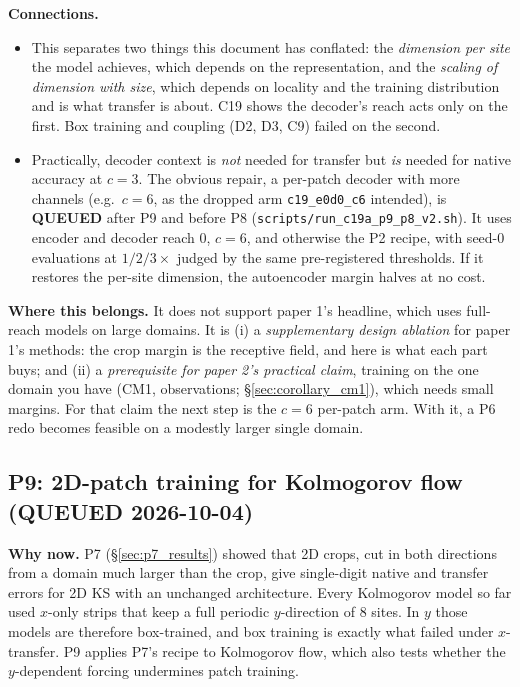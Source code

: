 \documentclass[11pt]{article}
\begin{document}
\textbf{Connections.}
\begin{itemize}[leftmargin=*]
\item This separates two things this document has conflated: the
  \emph{dimension per site} the model achieves, which depends on the
  representation, and the \emph{scaling of dimension with size}, which
  depends on locality and the training distribution and is what
  transfer is about. C19 shows the decoder's reach acts only on the
  first. Box training and coupling (D2, D3, C9) failed on the second.
\item Practically, decoder context is \emph{not} needed for transfer
  but \emph{is} needed for native accuracy at $c{=}3$. The obvious
  repair, a per-patch decoder with more channels (e.g.\ $c{=}6$, as the
  dropped arm \texttt{c19\_e0d0\_c6} intended), is \textbf{QUEUED}
  after P9 and before P8 (\texttt{scripts/run\_c19a\_p9\_p8\_v2.sh}).
  It uses encoder and decoder reach 0, $c{=}6$, and otherwise the P2
  recipe, with seed-0 evaluations at $1/2/3\times$ judged by the same
  pre-registered thresholds. If it
  restores the per-site dimension, the autoencoder margin halves at no
  cost.
\end{itemize}

\textbf{Where this belongs.} It does not support paper 1's headline,
which uses full-reach models on large domains. It is
(i) a \emph{supplementary design ablation} for paper 1's methods: the
crop margin is the receptive field, and here is what each part buys;
and (ii) a \emph{prerequisite for paper 2's practical claim}, training
on the one domain you have (CM1, observations;
\S\ref{sec:corollary_cm1}), which needs small margins. For that claim
the next step is the $c{=}6$ per-patch arm. With it, a P6 redo becomes
feasible on a modestly larger single domain.

\subsection{P9: 2D-patch training for Kolmogorov flow (QUEUED 2026-10-04)}
\label{sec:p9}

\textbf{Why now.} P7 (\S\ref{sec:p7_results}) showed that 2D crops,
cut in both directions from a domain much larger than the crop, give
single-digit native and transfer errors for 2D KS with an unchanged
architecture. Every Kolmogorov model so far used $x$-only strips that
keep a full periodic $y$-direction of 8 sites. In $y$ those models are
therefore box-trained, and box training is exactly what failed under
$x$-transfer. P9 applies P7's recipe to Kolmogorov flow, which also
tests whether the $y$-dependent forcing undermines patch training.
\end{document}
